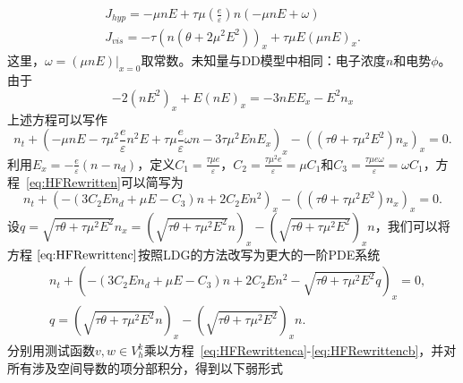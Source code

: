 $$
    \begin{gathered}
        J_{h y p}=-\mu n E+\tau \mu\left(\frac{e}{\varepsilon}\right) n(-\mu n E+\omega) \\
        J_{v i s}=-\tau\left(n\left(\theta+2 \mu^{2} E^{2}\right)\right)_{x}+\tau \mu E(\mu n E)_{x} .
    \end{gathered}
$$
这里，$\omega=\left.(\mu n E)\right|_{x=0}$取常数。未知量与DD模型中相同：电子浓度$n$和电势$\phi$。由于
$$
    -2\left(n E^{2}\right)_{x}+E(n E)_{x}=-3 n E E_{x}-E^{2} n_{x}
$$
上述方程可以写作
\begin{equation}
    n_{t}+\left(-\mu n E-\tau \mu^{2} \frac{e}{\varepsilon} n^{2} E+\tau \mu \frac{e}{\varepsilon} \omega n-3 \tau \mu^{2} E n E_{x}\right)_{x}-\left(\left(\tau \theta+\tau \mu^{2} E^{2}\right) n_{x}\right)_{x}=0.\label{eq:HFRewritten}
\end{equation}
利用$E_{x}=-\frac{e}{\varepsilon}\left(n-n_{d}\right)$，定义$C_{1}=\frac{\tau \mu e}{\varepsilon}$，$C_{2}=\frac{\tau \mu^{2} e}{\varepsilon}=\mu C_{1}$和$C_{3}=\frac{\tau \mu e \omega}{\varepsilon}=\omega C_{1}$，方程~\eqref{eq:HFRewritten}可以简写为
\begin{equation}
    n_{t}+\left(-\left(3 C_{2} E n_{d}+\mu E-C_{3}\right) n+2 C_{2} E n^{2}\right)_{x}-\left(\left(\tau \theta+\tau \mu^{2} E^{2}\right) n_{x}\right)_{x}=0 .  \label{eq:HFRewrittenc}
\end{equation}
设$q=\sqrt{\tau \theta+\tau \mu^{2} E^{2}} n_{x}=\left(\sqrt{\tau \theta+\tau \mu^{2} E^{2}} n\right)_{x}-\left(\sqrt{\tau \theta+\tau \mu^{2} E^{2}}\right)_{x} n$，我们可以将方程$~\eqref{eq:HFRewrittenc}$按照LDG的方法改写为更大的一阶PDE系统
\begin{align}
     & n_{t}+\left(-\left(3 C_{2} E n_{d}+\mu E-C_{3}\right) n+2 C_{2} E n^{2}-\sqrt{\tau \theta+\tau \mu^{2} E^{2}} q\right)_{x}=0, \label{eq:HFRewrittenca} \\
     & q=\left(\sqrt{\tau \theta+\tau \mu^{2} E^{2}} n\right)_{x}-\left(\sqrt{\tau \theta+\tau \mu^{2} E^{2}}\right)_{x} n.\label{eq:HFRewrittencb}
\end{align}
分别用测试函数$v, w \in V_{h}^{k}$乘以方程~\eqref{eq:HFRewrittenca}-\eqref{eq:HFRewrittencb}，并对所有涉及空间导数的项分部积分，得到以下弱形式
